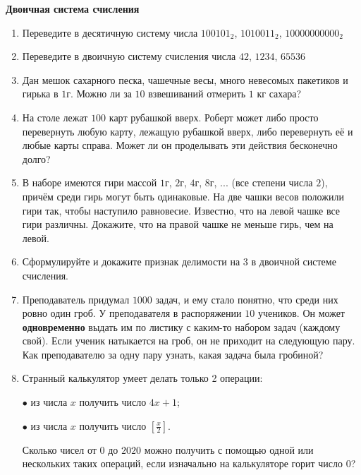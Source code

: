 \documentclass{article}
\begin{document}
\large
	
\begin{center}
	\textbf{Двоичная система счисления}
\end{center}

\begin{enumerate}[label*=\protect\fbox{\arabic{enumi}}]
\item Переведите в десятичную систему числа $100101_2$, $1010011_2$, $10000000000_2$

\item Переведите в двоичную систему счисления числа $42$, $1234$, $65536$

\item Дан мешок сахарного песка, чашечные весы, много невесомых пакетиков и гирька в $1$г. Можно ли за $10$ взвешиваний отмерить $1$ кг сахара? 

\item На столе лежат $100$ карт рубашкой вверх. Роберт может либо просто перевернуть любую карту, лежащую рубашкой вверх, либо перевернуть её и любые карты справа. Может ли он проделывать эти действия бесконечно долго?

\item В наборе имеются гири массой $1$г, $2$г, $4$г, $8$г, ... (все степени числа $2$), причём среди гирь могут быть одинаковые. На две чашки весов положили гири так, чтобы наступило равновесие. Известно, что на левой чашке все гири различны.  Докажите, что на правой чашке не меньше гирь, чем на левой.

\item Сформулируйте и докажите признак делимости на $3$ в двоичной системе счисления.

\item Преподаватель придумал $1000$ задач, и ему стало понятно, что среди них ровно один гроб. У преподавателя в распоряжении $10$ учеников. Он может \textbf{одновременно} выдать им по листику с каким-то набором задач (каждому свой). Если ученик натыкается на гроб, он не приходит на следующую пару. Как преподавателю за одну пару узнать, какая задача была гробиной?

\item Странный калькулятор умеет делать только 2 операции:

$\bullet$ из числа $x$ получить число $4x+1$;

$\bullet$ из числа $x$ получить число $\left[\frac{x}{2}\right]$.

Сколько чисел от $0$ до $2020$ можно получить с помощью одной или нескольких таких операций, если изначально на калькуляторе горит число $0$?


\end{enumerate}
\end{document}
